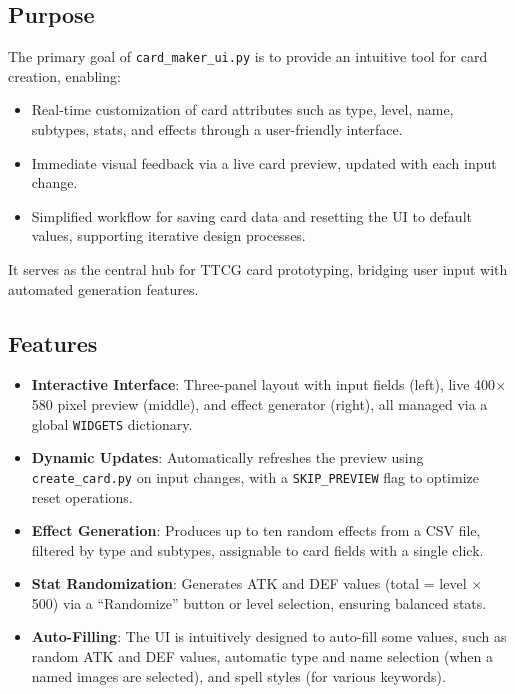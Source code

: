 \subsection{Purpose}
The primary goal of \texttt{card\_maker\_ui.py} is to provide an intuitive tool for card creation, enabling:
\begin{itemize}
	\item Real-time customization of card attributes such as type, level, name, subtypes, stats, and effects through a user-friendly interface.
	\item Immediate visual feedback via a live card preview, updated with each input change.
	\item Simplified workflow for saving card data and resetting the UI to default values, supporting iterative design processes.
\end{itemize}
It serves as the central hub for TTCG card prototyping, bridging user input with automated generation features.

\subsection{Features}
\begin{itemize}
	\item \textbf{Interactive Interface}: Three-panel layout with input fields (left), live 400$\times$580 pixel preview (middle), and effect generator (right), all managed via a global \texttt{WIDGETS} dictionary.
	\item \textbf{Dynamic Updates}: Automatically refreshes the preview using \texttt{create\_card.py} on input changes, with a \texttt{SKIP\_PREVIEW} flag to optimize reset operations.
	\item \textbf{Effect Generation}: Produces up to ten random effects from a CSV file, filtered by type and subtypes, assignable to card fields with a single click.
	\item \textbf{Stat Randomization}: Generates ATK and DEF values (total = level $\times$ 500) via a ``Randomize'' button or level selection, ensuring balanced stats.
 	\item \textbf{Auto-Filling}: The UI is intuitively designed to auto-fill some values, such as random ATK and DEF values, automatic type and name selection (when a named images are selected), and spell styles (for various keywords).
\end{itemize}

